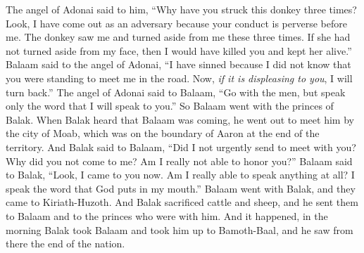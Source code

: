 \begin{biblechapter}
\verse The angel of Adonai said to him, “Why have you struck this donkey three times? Look, I have come out as an adversary because your conduct is perverse before me.
\verse The donkey saw me and turned aside from me these three times. If she had not turned aside from my face, then I would have killed you and kept her alive.”
\verse Balaam said to the angel of Adonai, “I have sinned because I did not know that you were standing to meet me in the road. Now, \textit{if it is displeasing to you}, I will turn back.”
\verse The angel of Adonai said to Balaam, “Go with the men, but speak only the word that I will speak to you.” So Balaam went with the princes of Balak.
\verse When Balak heard that Balaam was coming, he went out to meet him by the city of Moab, which was on the boundary of Aaron at the end of the territory.
\verse And Balak said to Balaam, “Did I not urgently send to meet with you? Why did you not come to me? Am I really not able to honor you?”
\verse Balaam said to Balak, “Look, I came to you now. Am I really able to speak anything at all? I speak the word that God puts in my mouth.”
\verse Balaam went with Balak, and they came to Kiriath-Huzoth.
\verse And Balak sacrificed cattle and sheep, and he sent them to Balaam and to the princes who were with him.
\verse And it happened, in the morning Balak took Balaam and took him up to Bamoth-Baal, and he saw from there the end of the nation.
\end{biblechapter}

